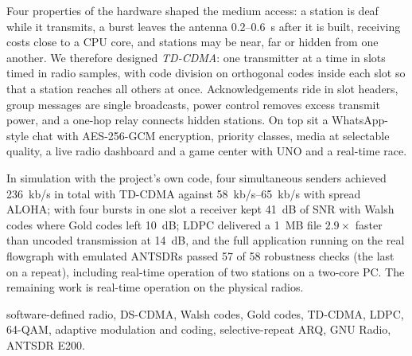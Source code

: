 \documentclass[11pt,a4paper,oneside]{report}
\begin{document}
Four properties of the hardware shaped the medium access: a station is deaf while it transmits,
a burst leaves the antenna 0.2--\SI{0.6}{s} after it is built, receiving costs close to a CPU core,
and stations may be near, far or hidden from one another. We therefore designed \emph{TD-CDMA}: one
transmitter at a time in slots timed in radio samples, with code division on orthogonal codes inside
each slot so that a station reaches all others at once. Acknowledgements ride in slot headers, group messages
are single broadcasts, power control removes excess transmit power, and a one-hop relay connects
hidden stations. On top sit a WhatsApp-style chat with AES-256-GCM encryption, priority classes,
media at selectable quality, a live radio dashboard and a game center with UNO and a real-time race.

In simulation with the project's own code, four simultaneous senders achieved \SI{236}{kb/s} in
total with TD-CDMA against \SIrange{58}{65}{kb/s} with spread ALOHA; with four bursts in one slot a
receiver kept \SI{41}{dB} of SNR with Walsh codes where Gold codes left \SI{10}{dB}; LDPC delivered a \SI{1}{MB} file
$2.9\times$ faster than uncoded transmission at \SI{14}{dB}, and the full application running on the
real flowgraph with emulated ANTSDRs passed 57 of 58 robustness checks (the last on a repeat),
including real-time operation of two stations on a two-core PC. The remaining work is real-time
operation on the physical radios.

\vspace{6mm}
 software-defined radio, DS-CDMA, Walsh codes,
Gold codes, TD-CDMA, LDPC, 64-QAM, adaptive modulation and coding, selective-repeat ARQ, GNU Radio,
ANTSDR E200.

\tableofcontents
\setcounter{tocdepth}{1}%
\listoffigures
\listoftables
\end{document}
